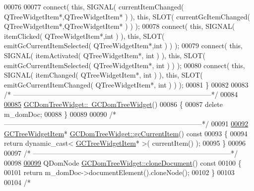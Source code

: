 \begin{DoxyCode}
00076 
00077   connect( \textcolor{keyword}{this}, SIGNAL( currentItemChanged( QTreeWidgetItem*,QTreeWidgetItem* 
      ) ), \textcolor{keyword}{this}, SLOT( currentGcItemChanged( QTreeWidgetItem*,QTreeWidgetItem* ) ) );
00078   connect( \textcolor{keyword}{this}, SIGNAL( itemClicked( QTreeWidgetItem*,\textcolor{keywordtype}{int} ) ), \textcolor{keyword}{this}, SLOT( 
      emitGcCurrentItemSelected( QTreeWidgetItem*,\textcolor{keywordtype}{int} ) ) );
00079   connect( \textcolor{keyword}{this}, SIGNAL( itemActivated( QTreeWidgetItem*, \textcolor{keywordtype}{int} ) ), \textcolor{keyword}{this}, SLOT( 
      emitGcCurrentItemSelected( QTreeWidgetItem*, \textcolor{keywordtype}{int} ) ) );
00080   connect( \textcolor{keyword}{this}, SIGNAL( itemChanged( QTreeWidgetItem*, \textcolor{keywordtype}{int} ) ), \textcolor{keyword}{this}, SLOT( 
      emitGcCurrentItemChanged( QTreeWidgetItem*, \textcolor{keywordtype}{int} ) ) );
00081 \}
00082 
00083 \textcolor{comment}{/*
      --------------------------------------------------------------------------------------*/}
00084 
\hypertarget{gcdomtreewidget_8cpp_source_l00085}{}\hyperlink{class_g_c_dom_tree_widget_aca9ba75d3798606da3f4e86c2a4b7113}{00085} \hyperlink{class_g_c_dom_tree_widget_aca9ba75d3798606da3f4e86c2a4b7113}{GCDomTreeWidget::~GCDomTreeWidget}()
00086 \{
00087   \textcolor{keyword}{delete} m\_domDoc;
00088 \}
00089 
00090 \textcolor{comment}{/*
      --------------------------------------------------------------------------------------*/}
00091 
\hypertarget{gcdomtreewidget_8cpp_source_l00092}{}\hyperlink{class_g_c_dom_tree_widget_a70d6a155777d375f3923c2d66e702d15}{00092} \hyperlink{class_g_c_tree_widget_item}{GCTreeWidgetItem}* \hyperlink{class_g_c_dom_tree_widget_a70d6a155777d375f3923c2d66e702d15}{GCDomTreeWidget::gcCurrentItem}()\textcolor{keyword}{ const}
00093 \textcolor{keyword}{}\{
00094   \textcolor{keywordflow}{return} \textcolor{keyword}{dynamic\_cast<} \hyperlink{class_g_c_tree_widget_item}{GCTreeWidgetItem}* \textcolor{keyword}{>}( currentItem() );
00095 \}
00096 
00097 \textcolor{comment}{/*
      --------------------------------------------------------------------------------------*/}
00098 
\hypertarget{gcdomtreewidget_8cpp_source_l00099}{}\hyperlink{class_g_c_dom_tree_widget_a25d3fcc908e06b83eba4f7d1c0e0df89}{00099} QDomNode \hyperlink{class_g_c_dom_tree_widget_a25d3fcc908e06b83eba4f7d1c0e0df89}{GCDomTreeWidget::cloneDocument}()\textcolor{keyword}{ const}
00100 \textcolor{keyword}{}\{
00101   \textcolor{keywordflow}{return} m\_domDoc->documentElement().cloneNode();
00102 \}
00103 
00104 \textcolor{comment}{/*
}
\end{DoxyCode}
